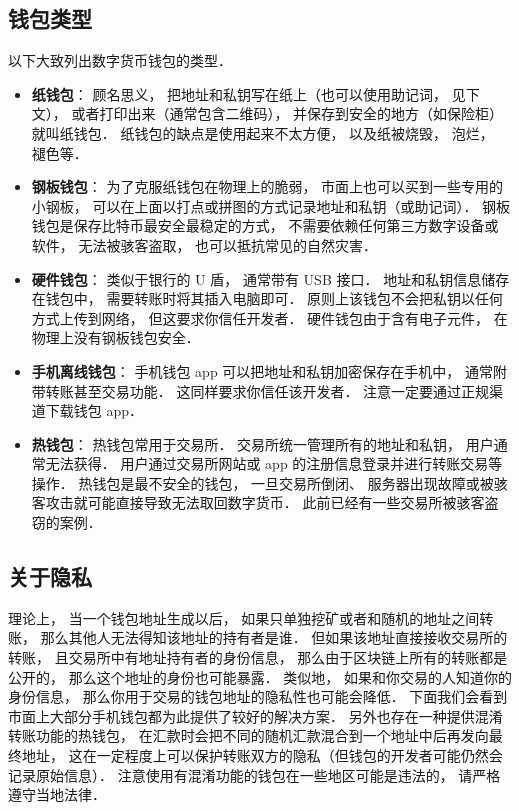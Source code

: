 \subsection{钱包类型}
以下大致列出数字货币钱包的类型．
\begin{itemize}
\item \textbf{纸钱包}： 顾名思义， 把地址和私钥写在纸上（也可以使用助记词， 见下文）， 或者打印出来（通常包含二维码）， 并保存到安全的地方（如保险柜）就叫纸钱包． 纸钱包的缺点是使用起来不太方便， 以及纸被烧毁， 泡烂， 褪色等．
\item \textbf{钢板钱包}： 为了克服纸钱包在物理上的脆弱， 市面上也可以买到一些专用的小钢板， 可以在上面以打点或拼图的方式记录地址和私钥（或助记词）． 钢板钱包是保存比特币最安全最稳定的方式， 不需要依赖任何第三方数字设备或软件， 无法被骇客盗取， 也可以抵抗常见的自然灾害．
\item \textbf{硬件钱包}： 类似于银行的 U 盾， 通常带有 USB 接口． 地址和私钥信息储存在钱包中， 需要转账时将其插入电脑即可． 原则上该钱包不会把私钥以任何方式上传到网络， 但这要求你信任开发者． 硬件钱包由于含有电子元件， 在物理上没有钢板钱包安全．
\item \textbf{手机离线钱包}： 手机钱包 app 可以把地址和私钥加密保存在手机中， 通常附带转账甚至交易功能． 这同样要求你信任该开发者． 注意一定要通过正规渠道下载钱包 app．
\item \textbf{热钱包}： 热钱包常用于交易所． 交易所统一管理所有的地址和私钥， 用户通常无法获得． 用户通过交易所网站或 app 的注册信息登录并进行转账交易等操作． 热钱包是最不安全的钱包， 一旦交易所倒闭、 服务器出现故障或被骇客攻击就可能直接导致无法取回数字货币． 此前已经有一些交易所被骇客盗窃的案例．
\end{itemize}

\subsection{关于隐私}
理论上， 当一个钱包地址生成以后， 如果只单独挖矿或者和随机的地址之间转账， 那么其他人无法得知该地址的持有者是谁． 但如果该地址直接接收交易所的转账， 且交易所中有地址持有者的身份信息， 那么由于区块链上所有的转账都是公开的， 那么这个地址的身份也可能暴露． 类似地， 如果和你交易的人知道你的身份信息， 那么你用于交易的钱包地址的隐私性也可能会降低． 下面我们会看到市面上大部分手机钱包都为此提供了较好的解决方案． 另外也存在一种提供混淆转账功能的热钱包， 在汇款时会把不同的随机汇款混合到一个地址中后再发向最终地址， 这在一定程度上可以保护转账双方的隐私（但钱包的开发者可能仍然会记录原始信息）． 注意使用有混淆功能的钱包在一些地区可能是违法的， 请严格遵守当地法律．

